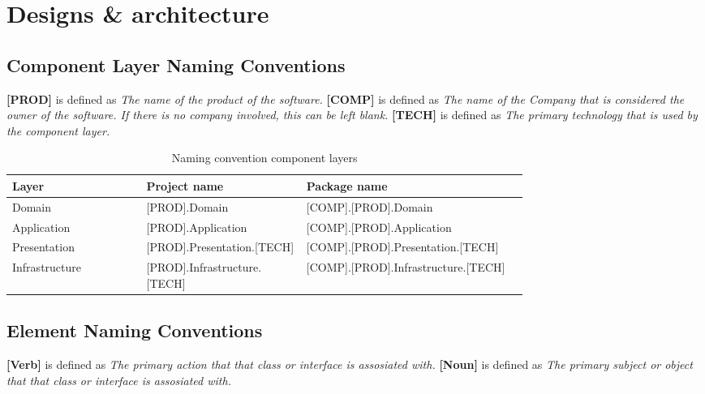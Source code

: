 \chapter{Designs \& architecture} \label{appendix_designs} 

\section{Component Layer Naming Conventions} \label{appendix_component_naming_convention}

\textbf{[PROD]} is defined as \textit{The name of the product of the software.} \newline 
\textbf{[COMP]} is defined as \textit{The name of the Company that is considered the owner of the software. If
there is no company involved, this can be left blank.} \newline 
\textbf{[TECH]} is defined as \textit{The primary technology that is used by the component layer.} 

\begin{table}[H]
    \footnotesize
    \begin{tabular}{ l p{0.31\linewidth} p{0.43\linewidth} }
    \hline
    \textbf{Layer} & \textbf{Project name} & \textbf{Package name} \\ 
    \hline
    Domain & [PROD].Domain & [COMP].[PROD].Domain \\
    Application & [PROD].Application & [COMP].[PROD].Application \\
    Presentation & [PROD].Presentation.[TECH] & [COMP].[PROD].Presentation.[TECH] \\
    Infrastructure & [PROD].Infrastructure.[TECH] & [COMP].[PROD].Infrastructure.[TECH]
    \\ \hline
    \end{tabular}
\caption{Naming convention component layers}
\label{table:component_naming_convention}
\end{table}

\section{Element Naming Conventions} \label{appendix_element_naming_convention}

\textbf{[Verb]} is defined as \textit{The primary action that that class or interface is assosiated with.} \newline 
\textbf{[Noun]} is defined as \textit{The primary subject or object that that class or interface is assosiated with.} 

